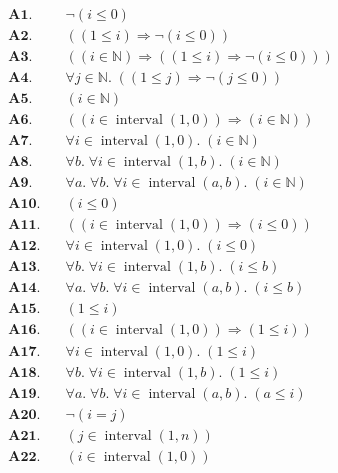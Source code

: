 \documentclass[11pt]{article}
\theoremstyle{plain}
\begin{document}
\begin{align*}
  \mathbf{A1.}\quad & \neg (i \leq 0) \\
  \mathbf{A2.}\quad & ((1 \leq i) \Rightarrow \neg (i \leq 0)) \\
  \mathbf{A3.}\quad & ((i \in \mathbb{N}) \Rightarrow ((1 \leq i) \Rightarrow \neg (i \leq 0))) \\
  \mathbf{A4.}\quad & \forall j \in \mathbb{N}.\; ((1 \leq j) \Rightarrow \neg (j \leq 0)) \\
  \mathbf{A5.}\quad & (i \in \mathbb{N}) \\
  \mathbf{A6.}\quad & ((i \in \operatorname{interval}(1, 0)) \Rightarrow (i \in \mathbb{N})) \\
  \mathbf{A7.}\quad & \forall i \in \operatorname{interval}(1, 0).\; (i \in \mathbb{N}) \\
  \mathbf{A8.}\quad & \forall b.\; \forall i \in \operatorname{interval}(1, b).\; (i \in \mathbb{N}) \\
  \mathbf{A9.}\quad & \forall a.\; \forall b.\; \forall i \in \operatorname{interval}(a, b).\; (i \in \mathbb{N}) \\
  \mathbf{A10.}\quad & (i \leq 0) \\
  \mathbf{A11.}\quad & ((i \in \operatorname{interval}(1, 0)) \Rightarrow (i \leq 0)) \\
  \mathbf{A12.}\quad & \forall i \in \operatorname{interval}(1, 0).\; (i \leq 0) \\
  \mathbf{A13.}\quad & \forall b.\; \forall i \in \operatorname{interval}(1, b).\; (i \leq b) \\
  \mathbf{A14.}\quad & \forall a.\; \forall b.\; \forall i \in \operatorname{interval}(a, b).\; (i \leq b) \\
  \mathbf{A15.}\quad & (1 \leq i) \\
  \mathbf{A16.}\quad & ((i \in \operatorname{interval}(1, 0)) \Rightarrow (1 \leq i)) \\
  \mathbf{A17.}\quad & \forall i \in \operatorname{interval}(1, 0).\; (1 \leq i) \\
  \mathbf{A18.}\quad & \forall b.\; \forall i \in \operatorname{interval}(1, b).\; (1 \leq i) \\
  \mathbf{A19.}\quad & \forall a.\; \forall b.\; \forall i \in \operatorname{interval}(a, b).\; (a \leq i) \\
  \mathbf{A20.}\quad & \neg (i = j) \\
  \mathbf{A21.}\quad & (j \in \operatorname{interval}(1, n)) \\
  \mathbf{A22.}\quad & (i \in \operatorname{interval}(1, 0)) \\

\end{align*}
\end{document}
